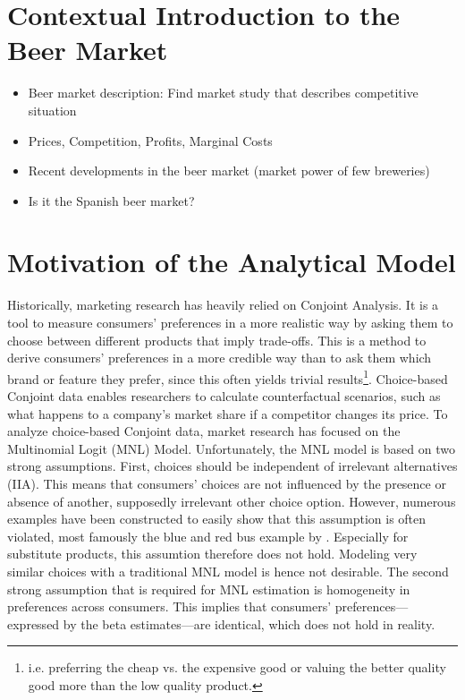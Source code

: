 \documentclass[12pt,a4paper]{article}
\begin{document}
\section{Contextual Introduction to the Beer Market}
\begin{itemize}
\item Beer market description: Find market study that describes competitive situation
\item Prices, Competition, Profits, Marginal Costs
\item Recent developments in the beer market (market power of few breweries)
\item Is it the Spanish beer market?
\end{itemize}

\section{Motivation of the Analytical Model}
Historically, marketing research has heavily relied on Conjoint Analysis.
It is a tool to measure consumers' preferences in a more realistic way by asking them to choose between different products that imply trade-offs.
This is a method to derive consumers' preferences in a more credible way than to ask them which brand or feature they prefer,
since this often yields trivial results\footnote{i.e. preferring the cheap vs. the expensive good or valuing the better quality good more than the low quality product.}.
Choice-based Conjoint data enables researchers to calculate counterfactual scenarios, such as what happens to a company's market share if a competitor changes its price.
To analyze choice-based Conjoint data, market research has focused on the Multinomial Logit (MNL) Model.
Unfortunately, the MNL model is based on two strong assumptions.
First, choices should be independent of irrelevant alternatives (IIA).
This means that consumers' choices are not influenced by the presence or absence of another, supposedly irrelevant other choice option.
However, numerous examples have been constructed to easily show that this assumption is often violated, most famously the blue and red bus example by \cite{mcfaddenConditionalLogitAnalysis1973}.
Especially for substitute products, this assumtion therefore does not hold. 
Modeling very similar choices with a traditional MNL model is hence not desirable.
The second strong assumption that is required for MNL estimation is homogeneity in preferences across consumers.
This implies that consumers' preferences---expressed by the beta estimates---are identical, which does not hold in reality. 
\end{document}
